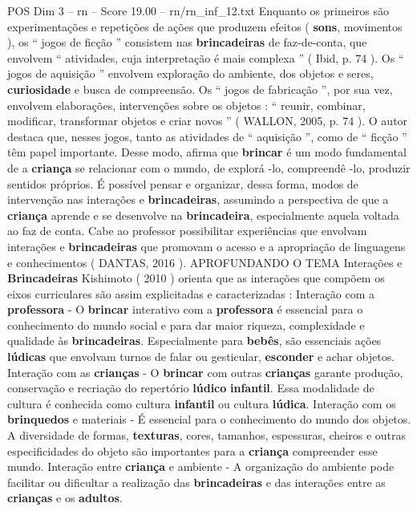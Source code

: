 \begin{textsample}{POS Dim 3 – rn – Score 19.00 – rn/rn\_inf\_12.txt}
Enquanto os primeiros são experimentações e repetições de ações que produzem efeitos ( \textbf{sons}, movimentos ), os “ jogos de ficção ” consistem nas \textbf{brincadeiras} de faz-de-conta, que envolvem “ atividades, cuja interpretação é mais complexa ” ( Ibid, p. 74 ).
Os “ jogos de aquisição ” envolvem exploração do ambiente, dos objetos e seres, \textbf{curiosidade} e busca de compreensão.
Os “ jogos de fabricação ”, por sua vez, envolvem elaborações, intervenções sobre os objetos : “ reunir, combinar, modificar, transformar objetos e criar novos ” ( WALLON, 2005, p. 74 ).
O autor destaca que, nesses jogos, tanto as atividades de “ aquisição ”, como de “ ficção ” têm papel importante.
Desse modo, afirma que \textbf{brincar} é um modo fundamental de a \textbf{criança} se relacionar com o mundo, de explorá -lo, compreendê -lo, produzir sentidos próprios.
É possível pensar e organizar, dessa forma, modos de intervenção nas interações e \textbf{brincadeiras}, assumindo a perspectiva de que a \textbf{criança} aprende e se desenvolve na \textbf{brincadeira}, especialmente aquela voltada ao faz de conta.
Cabe ao professor possibilitar experiências que envolvam interações e \textbf{brincadeiras} que promovam o acesso e a apropriação de linguagens e conhecimentos ( DANTAS, 2016 ).
APROFUNDANDO O TEMA Interações e \textbf{Brincadeiras} Kishimoto ( 2010 ) orienta que as interações que compõem os eixos curriculares são assim explicitadas e caracterizadas : Interação com a \textbf{professora} - O \textbf{brincar} interativo com a \textbf{professora} é essencial para o conhecimento do mundo social e para dar maior riqueza, complexidade e qualidade às \textbf{brincadeiras}.
Especialmente para \textbf{bebês}, são essenciais ações \textbf{lúdicas} que envolvam turnos de falar ou gesticular, \textbf{esconder} e achar objetos.
Interação com as \textbf{crianças} - O \textbf{brincar} com outras \textbf{crianças} garante produção, conservação e recriação do repertório \textbf{lúdico} \textbf{infantil}.
Essa modalidade de cultura é conhecida como cultura \textbf{infantil} ou cultura \textbf{lúdica}.
Interação com os \textbf{brinquedos} e materiais - É essencial para o conhecimento do mundo dos objetos.
A diversidade de formas, \textbf{texturas}, cores, tamanhos, espessuras, cheiros e outras especificidades do objeto são importantes para a \textbf{criança} compreender esse mundo.
Interação entre \textbf{criança} e ambiente - A organização do ambiente pode facilitar ou dificultar a realização das \textbf{brincadeiras} e das interações entre as \textbf{crianças} e os \textbf{adultos}.

\end{textsample}
